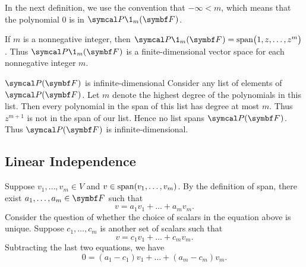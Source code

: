 
In the next definition, we use the convention that $-\infty < m$, which means that the polynomial $0$ is in $\P\1_m(\F{})$.


If $m$ is a nonnegative integer, then $\P\1_m(\F{}) = \Span \paren[\big]{1, z, \dots, z^m}$ . Thus $\P\1_m{(\F{})}$ is a finite-dimensional vector space for each nonnegative integer $m$.


\begin{example}{$\P(\F{})$ is infinite-dimensional}
Consider any list of elements of $\P(\F{})$.  Let $m$ denote the highest degree of the polynomials in this list.  Then every polynomial in the span of this list has degree at most $m$.  Thus $z^{m+1}$ is not in the span of our list. Hence no list spans $\P(\F{})$. Thus $\P(\F{})$ is infinite-dimensional.
\end{example}

\subsection{Linear Independence}

Suppose $v_1, \dots, v_m \in V$ and $v \in \operatorname{span} (v_1, \dots, v_m)$.
By the definition of span, there exist $a_1, \dots, a_m \in \F{}$ such
that
{\addtolength{\abovedisplayskip}{-.023in}\addtolength{\belowdisplayskip}{-.023in} %
\[
v = a_1 v_1 + \dots + a_m v_m.
\]
Consider the question of whether the choice of scalars in the equation
above is unique.  Suppose $c_1, \dots, c_m$ is another set
of scalars such that
\[
v = c_1 v_1 + \dots + c_m v_m.
\]
Subtracting the last two equations, we have
\[
0 = (a_1 - c_1) v_1 + \dots + (a_m - c_m)v_m.
\]}

